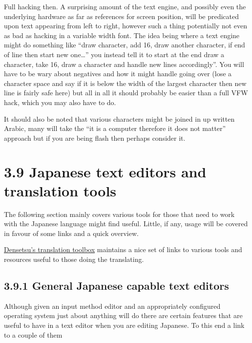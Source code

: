 \documentclass[
]{book}
\begin{document}
Full hacking then. A surprising amount of the text engine, and possibly even the underlying hardware as far as references for screen position, will be predicated upon text appearing from left to right, however such a thing potentially not even as bad as hacking in a variable width font. The idea being where a text engine might do something like ``draw character, add 16, draw another character, if end of line then start new one\ldots{}'' you instead tell it to start at the end draw a character, take 16, draw a character and handle new lines accordingly''. You will have to be wary about negatives and how it might handle going over (lose a character space and say if it is below the width of the largest character then new line is fairly safe here) but all in all it should probably be easier than a full VFW hack, which you may also have to do.

It should also be noted that various characters might be joined in up written Arabic, many will take the ``it is a computer therefore it does not matter'' approach but if you are being flash then perhaps consider it.

\hypertarget{japanese-text-editors-and-translation-tools}{%
\section{3.9 Japanese text editors and translation tools}\label{japanese-text-editors-and-translation-tools}}

The following section mainly covers various tools for those that need to work with the Japanese language might find useful. Little, if any, usage will be covered in favour of some links and a quick overview.

\href{http://gbatemp.net/topic/311523-densetsus-translation-toolbox/}{Densetsu's translation toolbox} maintains a nice set of links to various tools and resources useful to those doing the translating.

\hypertarget{general-japanese-capable-text-editors}{%
\subsection{3.9.1 General Japanese capable text editors}\label{general-japanese-capable-text-editors}}

Although given an input method editor and an appropriately configured operating system just about anything will do there are certain features that are useful to have in a text editor when you are editing Japanese. To this end a link to a couple of them
\end{document}
